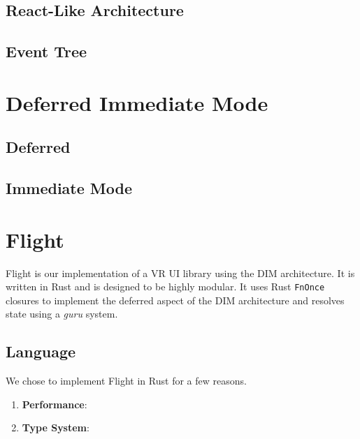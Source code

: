 \documentclass[conference,12pt]{IEEEtran}
\begin{document}
\subsection{React-Like Architecture}

\subsection{Event Tree}

\section{Deferred Immediate Mode}\label{sec:dim}

\subsection{Deferred}

\subsection{Immediate Mode}

\section{Flight}\label{sec:flight}
Flight is our implementation of a VR UI library using the DIM architecture. It
is written in Rust and is designed to be highly modular. It uses Rust
\texttt{FnOnce} closures to implement the deferred aspect of the DIM
architecture and resolves state using a \textit{guru} system.

\subsection{Language}
We chose to implement Flight in Rust for a few reasons.
\begin{enumerate}
    \item \textbf{Performance}: %
    \item \textbf{Type System}: %
\end{enumerate}
\end{document}
